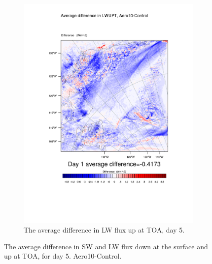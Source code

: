 \begin{figure}
\begin{subfigure}{0.48\textwidth}
		\includegraphics[width=\textwidth]{results/aero10/diff_Aero10_LWUPT_Day5.pdf}
		\caption{The average difference in LW flux up at TOA, day 5.}
		\label{subfig:lwup_r3Day5}
	\end{subfigure}
	\caption{The average difference in SW and LW flux down at the surface and up at TOA, for day 5. Aero10-Control.}
	\label{fig:radiation_r3Day5}
\end{figure}

